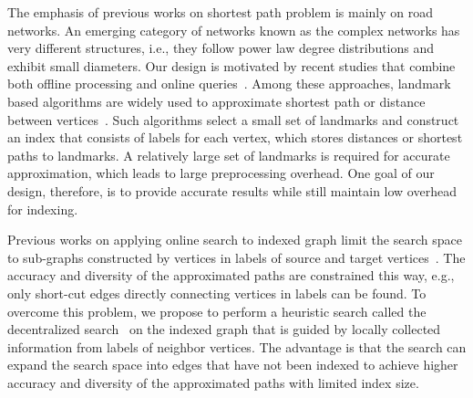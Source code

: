 The emphasis of previous works on shortest path problem is mainly on road networks. An emerging category of networks known as the complex networks has very different structures, i.e., they follow power law degree distributions and exhibit small diameters. 
Our design is motivated by recent studies that combine both offline processing and online queries~\cite{Potamias:2009:FSP:1645953.1646063, tretyakov2011fast, Akiba:2012:SQC:2247596.2247614, 6399472, Jin:2012:HLA:2213836.2213887}. 
Among these approaches, landmark based algorithms are widely used to approximate shortest path or distance between vertices~\cite{Thorup:2005:ADO:1044731.1044732, Goldberg:2005:CSP:1070432.1070455, Potamias:2009:FSP:1645953.1646063, Gubichev:2010:FAE:1871437.1871503, tretyakov2011fast, 6399472}. Such algorithms select a small set of landmarks and construct an index that consists of labels for each vertex, which stores distances or shortest paths to landmarks. A relatively large set of landmarks is required for accurate approximation, which leads to large preprocessing overhead.
One goal of our design, therefore, is to provide accurate results while still maintain low overhead for indexing.

Previous works on applying online search to indexed graph limit the search space to sub-graphs constructed by vertices in labels of source and target vertices~\cite{Gubichev:2010:FAE:1871437.1871503, 6399472}. The accuracy and diversity of the approximated paths are constrained this way, e.g., only short-cut edges directly connecting vertices in labels can be found. To overcome this problem, we propose to perform a heuristic search called the decentralized search~\cite{Kleinberg:2000p5066, kleinberg2006complex} on the indexed graph that is guided by locally collected information from labels of neighbor vertices. The advantage is that the search can expand the search space into edges that have not been indexed to achieve higher accuracy and diversity of the approximated paths with limited index size. 

